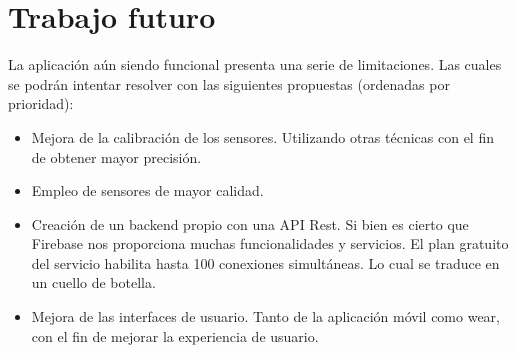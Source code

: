 \section*{Trabajo futuro}

La aplicación aún siendo funcional presenta una serie de limitaciones. Las cuales se podrán intentar resolver con las siguientes propuestas (ordenadas por prioridad):

\begin{itemize}
  \item Mejora de la calibración de los sensores. Utilizando otras técnicas con el fin de obtener mayor precisión.
  \item Empleo de sensores de mayor calidad.
  \item Creación de un backend propio con una API Rest. Si bien es cierto que Firebase nos proporciona muchas funcionalidades y servicios. El plan gratuito del servicio habilita hasta 100 conexiones simultáneas. Lo cual se traduce en un cuello de botella.
  \item Mejora de las interfaces de usuario. Tanto de la aplicación móvil como wear, con el fin de mejorar la experiencia de usuario.
\end{itemize}
